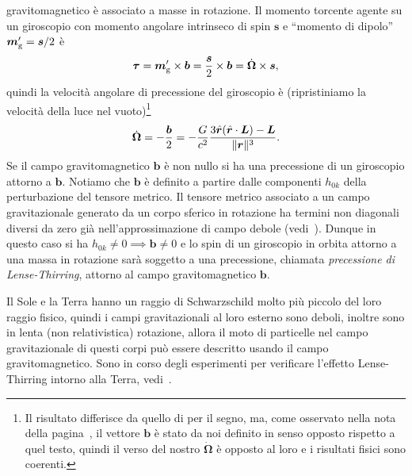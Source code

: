 gravitomagnetico è associato a masse in rotazione.  Il momento torcente agente
su un giroscopio con momento angolare intrinseco di spin $\bm{s}$ e ``momento di
dipolo'' $\bm{m}_{\textup{g}}' = \bm{s}/2$ è
\begin{equation}
  \bm{\tau} = \bm{m}_{\textup{g}}' \times \bm{b} = \frac{\bm{s}}{2} \times
  \bm{b} = \dot{\bm{\Omega}} \times \bm{s},
\end{equation}
quindi la velocità angolare di precessione del giroscopio è (ripristiniamo la
velocità della luce nel
vuoto)\footnote{Il risultato differisce da quello di
  \textcite[193]{ohanian:gravitazione} per il segno, ma, come osservato nella
  nota della pagina~\pageref{nota-b}, il vettore $\bm{b}$ è stato da noi
  definito in senso opposto rispetto a quel testo, quindi il verso del nostro
  $\dot{\bm{\Omega}}$ è opposto al loro e i risultati fisici sono coerenti.}
\begin{equation}
  \dot{\bm{\Omega}} = -\frac{\bm{b}}{2} =
  -\frac{G}{c^{2}}\frac{3\hat{\bm{r}}(\hat{\bm{r}} \cdot \bm{L}) -
    \bm{L}}{\lVert\bm{r}\rVert^{3}}.
\end{equation}
Se il campo gravitomagnetico $\bm{b}$ è non nullo si ha una precessione di un
giroscopio attorno a $\bm{b}$.  Notiamo che $\bm{b}$ è definito a partire dalle
componenti $h_{0k}$ della perturbazione del tensore metrico.  Il tensore metrico
associato a un campo gravitazionale generato da un corpo sferico in rotazione ha
termini non diagonali diversi da zero già nell'approssimazione di campo debole
(vedi~\textcite[192]{ohanian:gravitazione}).  Dunque in questo caso si ha
$h_{0k} \neq 0 \implies \bm{b} \neq 0$ e lo spin di un giroscopio in orbita
attorno a una massa in rotazione sarà soggetto a una precessione, chiamata
 \emph{precessione di Lense-Thirring},
attorno al campo gravitomagnetico $\bm{b}$.

Il Sole e la Terra hanno un raggio di Schwarzschild molto più piccolo del loro
raggio fisico, quindi i campi gravitazionali al loro esterno sono deboli,
inoltre sono in lenta (non relativistica) rotazione, allora il moto di
particelle nel campo gravitazionale di questi corpi può essere descritto usando
il campo gravitomagnetico.  Sono in corso degli esperimenti per verificare
l'effetto Lense-Thirring intorno alla Terra,
vedi~\textcite[193-195]{ohanian:gravitazione}.

